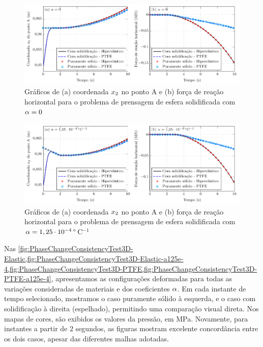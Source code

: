 \documentclass[Tese.tex]{subfiles}
\begin{document}
\begin{figure}[!htb]
	\centering
	\caption{Gráficos de (a) coordenada $x_2$ no ponto A e (b) força de reação horizontal para o problema de prensagem de esfera solidificada com $\alpha = 0$}
	\label{fig:PhaseChangeConsistencyTest3D-DisplacementAndReaction-a0}
	\includegraphics[scale=1.0]{Figuras/PhaseChangeConsistencyTest3D/DisplacementAndReaction-a0.pdf}
\end{figure}

\begin{figure}[!htb]
	\centering
	\caption{Gráficos de (a) coordenada $x_2$ no ponto A e (b) força de reação horizontal para o problema de prensagem de esfera solidificada com $\alpha = 1,25\cdot 10^{-4}\,^{\circ}$C$^{-1}$}
	\label{fig:PhaseChangeConsistencyTest3D-DisplacementAndReaction-a125e-4}
	\includegraphics[scale=1.0]{Figuras/PhaseChangeConsistencyTest3D/DisplacementAndReaction-a1e-4.pdf}
\end{figure}

Nas \cref{fig:PhaseChangeConsistencyTest3D-Elastic,fig:PhaseChangeConsistencyTest3D-Elastic-a125e-4,fig:PhaseChangeConsistencyTest3D-PTFE,fig:PhaseChangeConsistencyTest3D-PTFE-a125e-4}, apresentamos as configurações deformadas para todas as variações consideradas de materiais e dos coeficientes $\alpha$. Em cada instante de tempo selecionado, mostramos o caso puramente sólido à esquerda, e o caso com solidificação à direita (espelhado), permitindo uma comparação visual direta. Nos mapas de cores, são exibidos os valores da pressão, em MPa. Novamente, para instantes a partir de $2$ segundos, as figuras mostram excelente concordância entre os dois casos, apesar das diferentes malhas adotadas.
\end{document}
